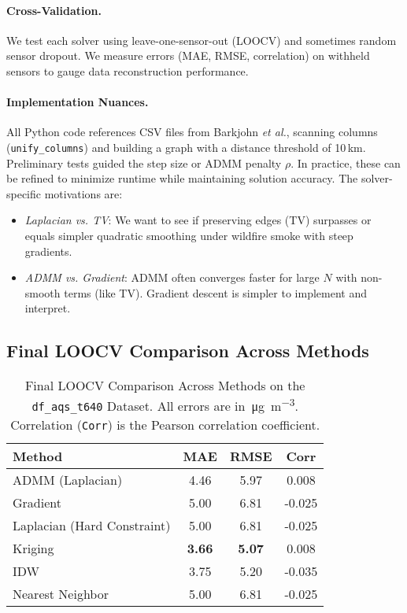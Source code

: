 \documentclass[12pt]{article}                                %
\begin{document}
\paragraph{Cross-Validation.} We test each solver using leave-one-sensor-out (LOOCV) and 
sometimes random sensor dropout. We measure errors (MAE, RMSE, correlation) on withheld 
sensors to gauge data reconstruction performance.

\paragraph{Implementation Nuances.}  
All Python code references CSV files from Barkjohn \emph{et al.}, scanning columns 
(\texttt{unify\_columns}) and building a graph with a distance threshold of 10\,km. 
Preliminary tests guided the step size or ADMM penalty $\rho$. In practice, these can be 
refined to minimize runtime while maintaining solution accuracy. The solver-specific 
motivations are:
\begin{itemize}
    \item \textit{Laplacian vs. TV}: We want to see if preserving edges (TV) surpasses or 
    equals simpler quadratic smoothing under wildfire smoke with steep gradients.
    \item \textit{ADMM vs. Gradient}: ADMM often converges faster for large $N$ with 
    non-smooth terms (like TV). Gradient descent is simpler to implement and interpret.
\end{itemize}

\subsection{Final LOOCV Comparison Across Methods}    %
\label{sec:finalLOOCV}

\begin{table}[!ht]
\centering
\caption{Final LOOCV Comparison Across Methods on the \texttt{df\_aqs\_t640} Dataset. 
All errors are in \,\si{\micro\gram\per\cubic\meter}. 
Correlation (\texttt{Corr}) is the Pearson correlation coefficient.}
\label{tab:finalResultsActual}
\begin{tabular}{lccc}
\toprule
\textbf{Method} & \textbf{MAE} & \textbf{RMSE} & \textbf{Corr}\\
\midrule
ADMM (Laplacian)               & 4.46  & 5.97  & 0.008  \\
Gradient                       & 5.00  & 6.81  & -0.025 \\
Laplacian (Hard Constraint)    & 5.00  & 6.81  & -0.025 \\
Kriging                        & \textbf{3.66} & \textbf{5.07} & 0.008 \\
IDW                            & 3.75  & 5.20  & -0.035 \\
Nearest Neighbor               & 5.00  & 6.81  & -0.025 \\
\bottomrule
\end{tabular}
\end{table}
\end{document}
